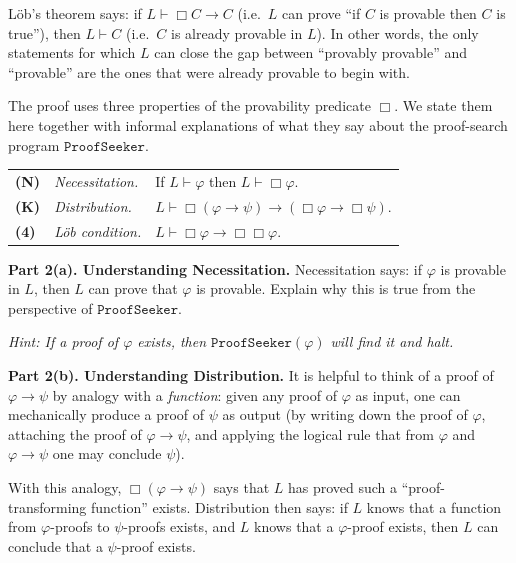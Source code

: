 \documentclass[11pt]{article}
\begin{document}
\begin{exercise}[L\"ob's theorem]
\label{ex:lob}
\noindent
L\"ob's theorem says: if $L \vdash \Box C \to C$ (i.e.\ $L$ can prove ``if $C$ is
provable then $C$ is true''), then $L \vdash C$ (i.e.\ $C$ is already provable in
$L$). In other words, the only statements for which $L$ can close the gap between
``provably provable'' and ``provable'' are the ones that were already provable to
begin with.

\medskip
\noindent
The proof uses three properties of the provability predicate $\Box$. We state them
here together with informal explanations of what they say about the proof-search
program $\texttt{ProofSeeker}$.

\medskip
\begin{center}
\begin{tabular}{lll}
  \textbf{(N)} & \emph{Necessitation.} & If $L \vdash \varphi$ then
    $L \vdash \Box\varphi$. \\
  \textbf{(K)} & \emph{Distribution.} & $L \vdash \Box(\varphi \to \psi) \to
    (\Box\varphi \to \Box\psi)$. \\
  \textbf{(4)} & \emph{L\"ob condition.} & $L \vdash \Box\varphi \to
    \Box\Box\varphi$.
\end{tabular}
\end{center}

\medskip
\noindent
\textbf{Part 2(a). Understanding Necessitation.} Necessitation says: if $\varphi$ is
provable in $L$, then $L$ can prove that $\varphi$ is provable. Explain why this is
true from the perspective of $\texttt{ProofSeeker}$.

\medskip
\noindent
\emph{Hint: If a proof of $\varphi$ exists, then $\texttt{ProofSeeker}(\varphi)$ will
find it and halt.}

\medskip
\noindent
\textbf{Part 2(b). Understanding Distribution.} It is helpful to think of a proof of
$\varphi \to \psi$ by analogy with a \emph{function}: given any proof of $\varphi$ as
input, one can mechanically produce a proof of $\psi$ as output (by writing down the
proof of $\varphi$, attaching the proof of $\varphi \to \psi$, and applying the
logical rule that from $\varphi$ and $\varphi \to \psi$ one may conclude $\psi$).

\medskip
\noindent
With this analogy, $\Box(\varphi \to \psi)$ says that $L$ has proved such a
``proof-transforming function'' exists. Distribution then says: if $L$ knows that a
function from $\varphi$-proofs to $\psi$-proofs exists, and $L$ knows that a
$\varphi$-proof exists, then $L$ can conclude that a $\psi$-proof exists.


\end{exercise}
\end{document}
